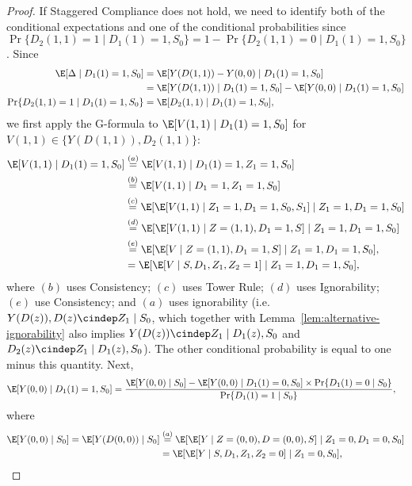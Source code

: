 \begin{proof}
If Staggered Compliance does not hold, we need to identify both of the conditional expectations and one of the conditional probabilities since $\Pr\{ D_2(1,1)=1 \mid D_1(1)=1, S_0 \} = 1- \Pr\{ D_2(1,1)=0 \mid D_1(1)=1, S_0 \}$.
Since 
\begin{align*}
\E[ \Delta \mid D_1(1)=1, S_0 ]
&=\E[ Y(D(1,1)) - Y(0,0) \mid D_1(1)=1, S_0 ]                           \\
&=\E[ Y(D(1,1)) \mid D_1(1)=1, S_0 ] - \E[ Y(0,0) \mid D_1(1)=1, S_0 ]  \\
\Pr\{ D_2(1,1)=1 \mid D_1(1)=1, S_0 \}
&=\E[ D_2(1,1) \mid D_1(1)=1, S_0 ], 
\end{align*}
we first apply the G-formula to $\E[V(1,1) \mid D_1(1)=1, S_0]$ for $V(1,1) \in \{Y(D(1,1)), D_2(1,1)\}$: 
\begin{align*}
\E[ V(1,1) \mid D_1(1)=1, S_0 ]
&\stackrel{(a)}{=}
  \E[ V(1,1) \mid D_1(1)=1, Z_1=1, S_0 ]  \\
&\stackrel{(b)}{=}
  \E[ V(1,1) \mid D_1=1, Z_1=1, S_0 ]     \\
&\stackrel{(c)}{=}
  \E[ \E[ V(1,1) \mid Z_1=1, D_1=1, S_0, S_1 ] \mid Z_1=1, D_1=1, S_0  ] \\
&\stackrel{(d)}{=}
  \E[ \E[ V(1,1) \mid Z=(1,1), D_1=1, S ] \mid Z_1=1, D_1=1, S_0  ]      \\
&\stackrel{(e)}{=}
  \E[ \E[ V \mid Z=(1,1), D_1=1, S] \mid Z_1=1, D_1=1, S_0  ], \\
&=
  \E[ \E[ V \mid S, D_1, Z_1, Z_2=1] \mid Z_1=1, D_1=1, S_0  ], 
\end{align*}
\noindent where
 $(b)$ uses Consistency; 
 $(c)$ uses Tower Rule; 
 $(d)$ uses Ignorability; 
 $(e)$ use Consistency; and 
 $(a)$ uses ignorability (i.e. $Y(D(z)), D(z) \cindep Z_1 \mid S_0$, which together with Lemma~\ref{lem:alternative-ignorability} also implies $Y(D(z)) \cindep Z_1 \mid D_1(z), S_0$ and $D_2(z) \cindep Z_1 \mid D_1(z), S_0$).
The other conditional probability is equal to one minus this quantity.
Next, 
\begin{align*}
\E[ Y(0,0) \mid D_1(1)=1, S_0 ]
&=\frac{
    \E[ Y(0,0) \mid S_0 ]
    - \E[ Y(0,0) \mid D_1(1)=0, S_0 ] \times \Pr\{ D_1(1)=0 \mid S_0 \}
  }{ \Pr\{ D_1(1)=1 \mid S_0 \} }, 
\end{align*}
where
\begin{align*}
\E[ Y(0,0) \mid S_0 ]
=\E[ Y(D(0,0)) \mid S_0 ]                      
&\stackrel{(a)}{=}\E[ \E[ Y \mid Z=(0,0), D=(0,0), S ] \mid Z_1=0, D_1=0, S_0 ]\\
&=\E[ \E[ Y \mid S, D_1, Z_1, Z_2=0] \mid Z_1=0, S_0],\\

\end{align*}
\end{proof}
